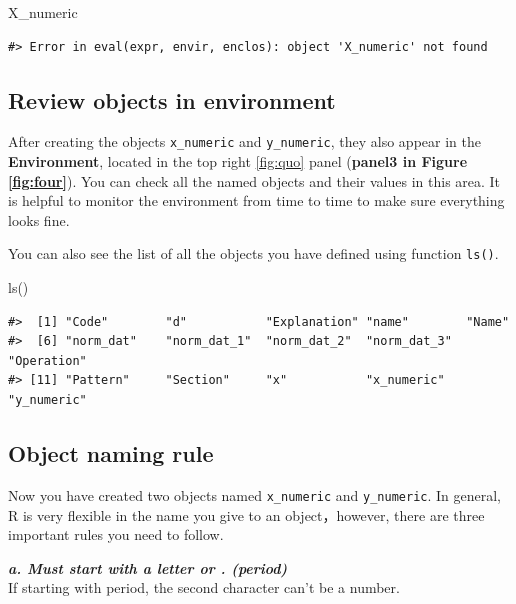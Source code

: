 \documentclass[
]{book}
\newenvironment{Shaded}{\begin{snugshade}}{\end{snugshade}}
\newcommand{\FunctionTok}[1]{\textcolor[rgb]{0.00,0.00,0.00}{#1}}
\newcommand{\NormalTok}[1]{#1}
\begin{document}
\begin{Shaded}
\begin{Highlighting}[]
\NormalTok{X\_numeric}
\end{Highlighting}
\end{Shaded}

\begin{verbatim}
#> Error in eval(expr, envir, enclos): object 'X_numeric' not found
\end{verbatim}

\hypertarget{review-objects-in-environment}{%
\subsection{Review objects in environment}\label{review-objects-in-environment}}

After creating the objects \texttt{x\_numeric} and \texttt{y\_numeric}, they also appear in the \textbf{Environment}, located in the top right \ref{fig:quo} panel (\textbf{panel3 in Figure \ref{fig:four}}). You can check all the named objects and their values in this area. It is helpful to monitor the environment from time to time to make sure everything looks fine.

You can also see the list of all the objects you have defined using function \texttt{ls()}.

\begin{Shaded}
\begin{Highlighting}[]
\FunctionTok{ls}\NormalTok{()}
\end{Highlighting}
\end{Shaded}

\begin{verbatim}
#>  [1] "Code"        "d"           "Explanation" "name"        "Name"       
#>  [6] "norm_dat"    "norm_dat_1"  "norm_dat_2"  "norm_dat_3"  "Operation"  
#> [11] "Pattern"     "Section"     "x"           "x_numeric"   "y_numeric"
\end{verbatim}

\hypertarget{Naming}{%
\subsection{Object naming rule}\label{Naming}}

Now you have created two objects named \texttt{x\_numeric} and \texttt{y\_numeric}. In general, R is very flexible in the name you give to an object，however, there are three important rules you need to follow.

\textbf{\emph{a. Must start with a letter or . (period)}}\\
If starting with period, the second character can't be a number.
\end{document}
